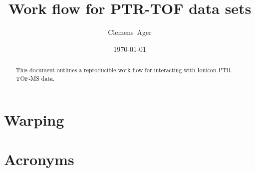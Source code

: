 \documentclass[twocolumn]{article}
\title{Work flow for PTR-TOF data sets}
\author{Clemens~Ager}
\date{\today}
\begin{document}
\maketitle

\begin{abstract}
  This document outlines a reproducible work flow for interacting with
  Ionicon \ac{PTR-TOF-MS} data.  
\end{abstract}


\setcounter{tocdepth}{2}
\tableofcontents



\section{Warping}



\appendix 
\section{Acronyms}


\printbibliography
\end{document}
